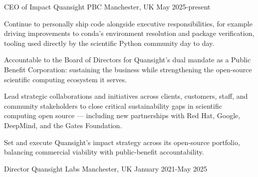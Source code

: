 


\begin{cventries}


\cventry
{CEO of Impact} %
{Quansight PBC} %
{Manchester, UK} %
{May 2025-present } %
{ %
\begin{cvitems}
    \item {Continue to personally ship code alongside executive responsibilities, for example driving improvements to conda's environment resolution and package verification, tooling used directly by the scientific Python community day to day.}
    \item {Accountable to the Board of Directors for Quansight's dual mandate as a Public Benefit Corporation: sustaining the business while strengthening the open-source scientific computing ecosystem it serves.}
    \item {Lead strategic collaborations and  initiatives across clients, customers, staff, and community stakeholders to close critical sustainability gaps in scientific computing open source — including new partnerships with Red Hat, Google, DeepMind, and the Gates Foundation.}
    \item {Set and execute Quansight's impact strategy across its open-source portfolio, balancing commercial viability with public-benefit accountability.}
\end{cvitems}
}
\cventry
{Director} %
{Quansight Labs} %
{Manchester, UK} %
{January 2021-May 2025 } %
{ %
\begin{cvitems}

\end{cvitems}}
\end{cventries}
